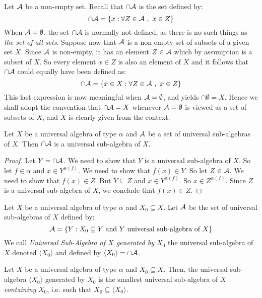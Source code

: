 Let ${\cal A}$ be a non-empty set. Recall that $\cap{\cal A}$ is the
set defined by:
    \[
    \cap{\cal A}=\{x:\forall Z\in{\cal A}\ ,\ x\in Z\}
    \]
When ${\cal A}=\emptyset$, the set $\cap{\cal A}$ is normally not
defined, as there is no such things as {\em the set of all sets}.
Suppose now that ${\cal A}$ is a non-empty set of subsets of a given
set $X$. Since ${\cal A}$ is non-empty, it has an element $Z\in{\cal
A}$ which by assumption is a subset of $X$. So every element $x\in
Z$ is also an element of $X$ and it follows that $\cap{\cal A}$
could equally have been defined as:
    \[
    \cap{\cal A}=\{x\in X: \forall Z\in{\cal A}\ ,\ x\in Z\}
    \]
This last expression is now meaningful when ${\cal A}=\emptyset$,
and yields $\cap\emptyset = X$. Hence we shall adopt the convention
that $\cap{\cal A}=X$ whenever ${\cal A}=\emptyset$ is viewed as a
set of subsets of $X$, and $X$ is clearly given from the context.
\begin{prop}\label{logic:prop:intersection}
Let $X$ be a universal algebra of type $\alpha$ and ${\cal A}$ be a
set of universal sub-algebras of $X$. Then $\cap{\cal A}$ is a
universal sub-algebra of $X$.
\end{prop}
\begin{proof}
Let $Y=\cap{\cal A}$. We need to show that $Y$ is a universal
sub-algebra of $X$. So let $f\in\alpha$ and $x\in Y^{\alpha(f)}$. We
need to show that $f(x)\in Y$. So let $Z\in{\cal A}$. We need to
show that $f(x)\in Z$. But $Y\subseteq Z$ and $x\in Y^{\alpha(f)}$.
So $x\in Z^{\alpha(f)}$. Since $Z$ is a universal sub-algebra of
$X$, we conclude that $f(x)\in Z$.
\end{proof}
\begin{defin}\label{logic:def:generated:sub:algebra}
Let $X$ be a universal algebra of type $\alpha$ and $X_{0}\subseteq
X$. Let ${\cal A}$ be the set of universal sub-algebras of $X$
defined by:
    \[
    {\cal A}=\{Y: X_{0}\subseteq Y\mbox{\ and\ } Y\mbox{\ universal sub-algebra of\ }X\}
    \]
We call {\em Universal Sub-Algebra of $X$ generated by $X_{0}$} the
universal sub-algebra of $X$ denoted $\langle X_{0}\rangle$ and
defined by $\langle X_{0}\rangle=\cap{\cal A}$.
\end{defin}
\begin{prop}\label{logic:prop:generated:smallest}
Let $X$ be a universal algebra of type $\alpha$ and $X_{0}\subseteq
X$. Then, the universal sub-algebra $\langle X_{0}\rangle$ generated
by $X_{0}$ is the smallest universal sub-algebra of $X$ {\em
containing} $X_{0}$, i.e. such that $X_{0}\subseteq \langle
X_{0}\rangle$.
\end{prop}
